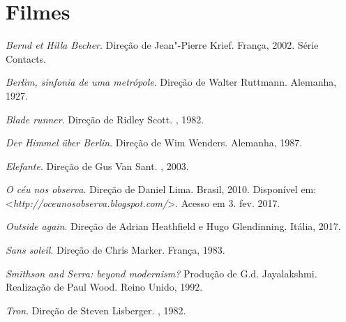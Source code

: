 \section{Filmes}

\begin{Parskip}
\emph{Bernd et Hilla Becher}. Direção de Jean"-Pierre Krief. França, 2002. Série
Contacts.

\emph{Berlim, sinfonia de uma metrópole}. Direção de Walter Ruttmann. Alemanha,
1927.

\emph{Blade runner}. Direção de Ridley Scott. , 1982.

\emph{Der Himmel über Berlin}. Direção de Wim Wenders. Alemanha, 1987.

\emph{Elefante}. Direção de Gus Van Sant. , 2003.

\emph{O céu nos observa}. Direção de Daniel Lima. Brasil, 2010. Disponível em: \textless{}\emph{http://oceunosobserva.blogspot.com/}\textgreater{}. Acesso em 3. fev. 2017.

\emph{Outside again}. Direção de Adrian Heathfield e Hugo Glendinning. Itália, 2017.

\emph{Sans soleil}. Direção de Chris Marker. França, 1983.

\emph{Smithson and Serra: beyond modernism?} Produção de G.d. Jayalakshmi.
Realização de Paul Wood. Reino Unido, 1992.

\emph{Tron}. Direção de Steven Lisberger. , 1982.
\end{Parskip}